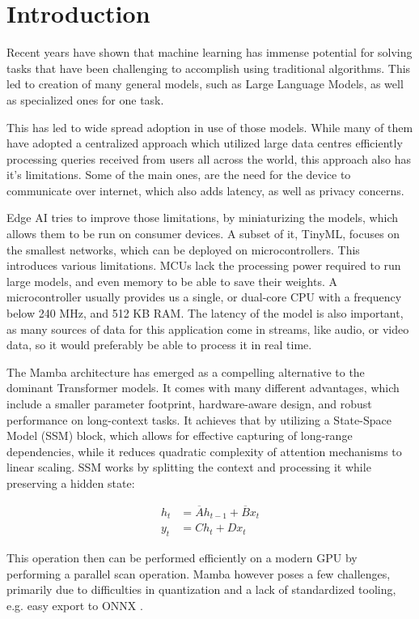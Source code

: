 \section{Introduction}

Recent years have shown that machine learning has immense potential for solving tasks that have been challenging to accomplish using traditional algorithms. This led to creation of many general models, such as Large Language Models, as well as specialized ones for one task.

This has led to wide spread adoption in use of those models. While many of them have adopted a centralized approach which utilized large data centres efficiently processing queries received from users all across the world, this approach also has it's limitations. Some of the main ones, are the need for the device to communicate over internet, which also adds latency, as well as privacy concerns.

Edge AI tries to improve those limitations, by miniaturizing the models, which allows them to be run on consumer devices. A subset of it, TinyML, focuses on the smallest networks, which can be deployed on microcontrollers. This introduces various limitations. MCUs lack the processing power required to run large models, and even memory to be able to save their weights. A microcontroller usually provides us a single, or dual-core CPU with a frequency below 240 MHz, and 512 KB RAM. The latency of the model is also important, as many sources of data for this application come in streams, like audio, or video data, so it would preferably be able to process it in real time.

The Mamba architecture \cite{mamba} has emerged as a compelling alternative to the dominant Transformer models. It comes with many different advantages, which include a smaller parameter footprint, hardware-aware design, and robust performance on long-context tasks. It achieves that by utilizing a State-Space Model (SSM) block, which allows for effective capturing of long-range dependencies, while it reduces quadratic complexity of attention mechanisms to linear scaling. SSM works by splitting the context and processing it while preserving a hidden state:

$$
\begin{aligned}
  h_t &= \overline{A} h_{t-1} + \overline{B} x_t \\
  y_t &= C h_t + D x_t
\end{aligned}
$$

This operation then can be performed efficiently on a modern GPU by performing a parallel scan operation. Mamba however poses a few challenges, primarily due to difficulties in quantization \cite{xuMambaQuantQuantizingMamba2025, tegonFEMBAEdgePhysiologicallyAware2026a} and a lack of standardized tooling, e.g. easy export to ONNX \cite{xuMambaLiteMicroMemoryOptimizedMamba2025}.

